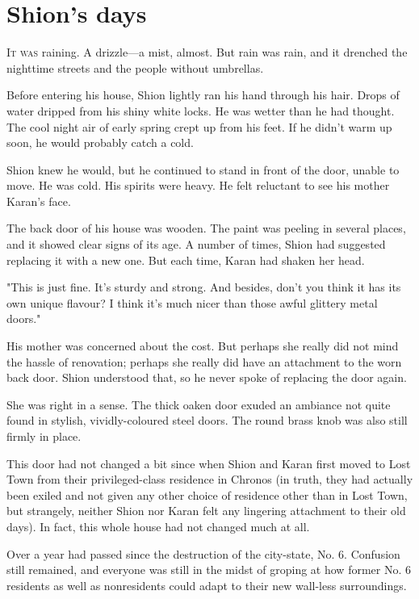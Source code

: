 
\chapter{Shion's days}

\lettrine{I}{t was} raining. A drizzle---a mist, almost. But rain was rain, and it
drenched the nighttime streets and the people without umbrellas.

Before entering his house, Shion lightly ran his hand through his hair.
Drops of water dripped from his shiny white locks. He was wetter than he
had thought. The cool night air of early spring crept up from his feet.
If he didn't warm up soon, he would probably catch a cold.

Shion knew he would, but he continued to stand in front of the door,
unable to move. He was cold. His spirits were heavy. He felt reluctant
to see his mother Karan's face.

The back door of his house was wooden. The paint was peeling in several
places, and it showed clear signs of its age. A number of times, Shion
had suggested replacing it with a new one. But each time, Karan had
shaken her head.

"This is just fine. It's sturdy and strong. And besides, don't you think
it has its own unique flavour? I think it's much nicer than those awful
glittery metal doors."

His mother was concerned about the cost. But perhaps she really did not
mind the hassle of renovation; perhaps she really did have an attachment
to the worn back door. Shion understood that, so he never spoke of
replacing the door again.

She was right in a sense. The thick oaken door exuded an ambiance not
quite found in stylish, vividly-coloured steel doors. The round brass
knob was also still firmly in place.

This door had not changed a bit since when Shion and Karan first moved
to Lost Town from their privileged-class residence in Chronos (in truth,
they had actually been exiled and not given any other choice of
residence other than in Lost Town, but strangely, neither Shion nor
Karan felt any lingering attachment to their old days). In fact, this
whole house had not changed much at all.

Over a year had passed since the destruction of the city-state, No. 6.
Confusion still remained, and everyone was still in the midst of groping
at how former No. 6 residents as well as nonresidents could adapt to
their new wall-less surroundings.

